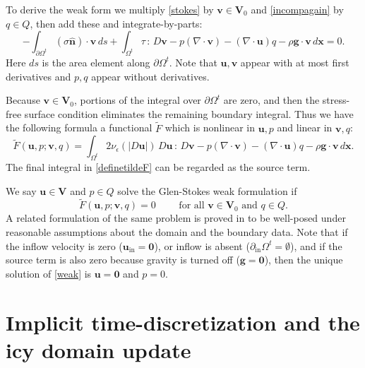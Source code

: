 \documentclass[letterpaper,final,12pt,reqno]{amsart}
\newcommand{\eps}{\epsilon}
\newcommand{\hbn}{\hat{\mathbf{n}}}
\newcommand{\bg}{\mathbf{g}}
\newcommand{\bu}{\mathbf{u}}
\newcommand{\bv}{\mathbf{v}}
\newcommand{\bx}{\mathbf{x}}
\newcommand{\bV}{\mathbf{V}}
\newcommand{\bzero}{\bm{0}}
\begin{document}
To derive the weak form we multiply \eqref{stokes} by $\bv\in \bV_0$ and \eqref{incompagain} by $q\in Q$, then add these and integrate-by-parts:
\begin{equation}
-\int_{\partial\Omega^t} (\sigma \hbn)\cdot \bv\,ds + \int_{\Omega^t} \tau \,:\,D\bv - p (\nabla \cdot \bv) - \left(\nabla \cdot \bu\right) q - \rho \mathbf{g} \cdot \bv \,d\bx = 0. \label{nonfunctwo}
\end{equation}
Here $ds$ is the area element along $\partial\Omega^t$.  Note that $\bu,\bv$ appear with at most first derivatives and $p,q$ appear without derivatives.

Because $\bv\in \bV_0$, portions of the integral over $\partial\Omega^t$ are zero, and then the stress-free surface condition eliminates the remaining boundary integral.  Thus we have the following formula a functional $\tilde F$ which is nonlinear in $\bu,p$ and linear in $\bv,q$:
\begin{equation}
\tilde F(\bu,p;\bv,q) = \int_{\Omega^t} 2 \nu_\eps(|D\bu|)\, D\bu\,:\,D\bv - p (\nabla \cdot \bv) - \left(\nabla \cdot \bu\right) q - \rho \mathbf{g} \cdot \bv \,d\bx. \label{definetildeF}
\end{equation}
The final integral in \eqref{definetildeF} can be regarded as the source term.

We say $\bu\in \bV$ and $p\in Q$ solve the Glen-Stokes weak formulation if
\begin{equation}
\tilde F(\bu,p;\bv,q) = 0 \qquad \text{ for all } \bv\in \bV_0 \text{ and } q\in Q.  \label{weak}
\end{equation}
A related formulation of the same problem is proved in \cite[Theorem 3.8]{JouvetRappaz2011} to be well-posed under reasonable assumptions about the domain and the boundary data.  Note that if the inflow velocity is zero ($\bu_{\text{in}}=\bzero$), or inflow is absent ($\partial_{\text{in}} \Omega^t = \emptyset$), and if the source term is also zero because gravity is turned off ($\bg=\bzero$), then the unique solution of \eqref{weak} is $\bu=\bzero$ and $p=0$.


\section{Implicit time-discretization and the icy domain update} \label{sec:implicitstep}
\end{document}
